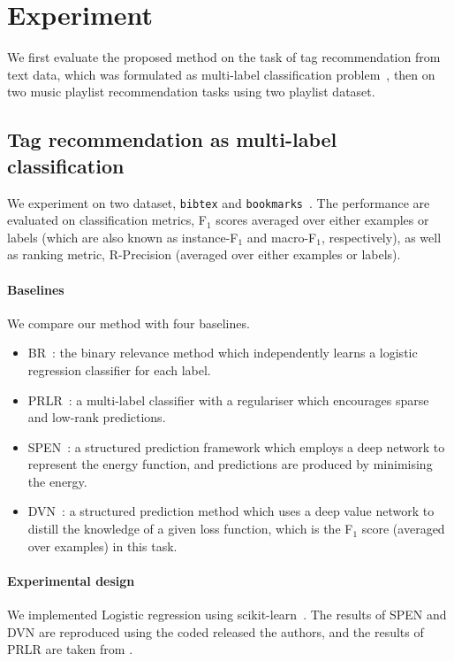 \clearpage
\newpage

\section{Experiment}
\label{sec:experiment}

We first evaluate the proposed method on the task of tag recommendation from text data,
which was formulated as multi-label classification problem~\cite{katakis2008multilabel},
then on two music playlist recommendation tasks using two playlist dataset.


\subsection{Tag recommendation as multi-label classification}
\label{ssec:mlc}

We experiment on two dataset, \texttt{bibtex} and \texttt{bookmarks}~\cite{katakis2008multilabel}.
The performance are evaluated on classification metrics, \ie F$_1$ scores averaged over either examples or labels 
(which are also known as instance-F$_1$ and macro-F$_1$, respectively),
as well as ranking metric, \ie R-Precision (averaged over either examples or labels).

\paragraph{Baselines}
We compare our method with four baselines.
\begin{itemize}
\item BR~\cite{tsoumakas2006multi}: the binary relevance method which independently learns a logistic regression classifier for each label.
\item PRLR~\cite{lin2014multi}: a multi-label classifier with a regulariser which encourages sparse and low-rank predictions.
\item SPEN~\cite{belanger2016structured}: a structured prediction framework which employs a deep network to represent the energy function,
      and predictions are produced by minimising the energy.
\item DVN~\cite{gygli2017deep}: a structured prediction method which uses a deep value network to distill the knowledge of a given loss function,
      which is the F$_1$ score (averaged over examples) in this task.
\end{itemize}

\paragraph{Experimental design}
We implemented Logistic regression using scikit-learn~\cite{scikit-learn}.
The results of SPEN and DVN are reproduced using the coded released the authors,
and the results of PRLR are taken from \cite{lin2014multi}.

